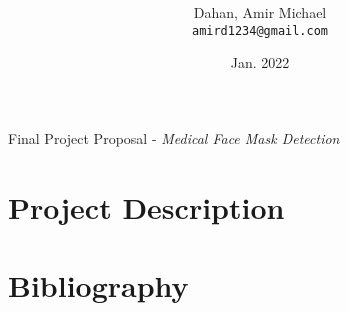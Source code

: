 

\title{ }

\author{
  Dahan, Amir Michael\\
  \texttt{amird1234@gmail.com}
}
\date{Jan. 2022}



\maketitle

Final Project Proposal - \emph{Medical Face Mask Detection}
    \clearpage

    \section{Project Description}\label{sec:description}
    

    \section{Bibliography}\label{sec:bibliography}
    



